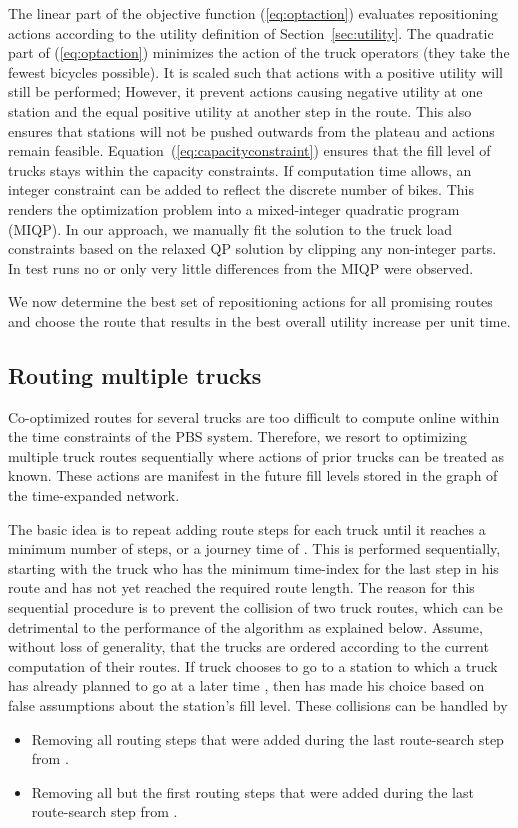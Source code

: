 \documentclass{article}
\begin{document}
The linear part of the objective function (\ref{eq:optaction}) evaluates
repositioning actions according to the utility definition of
Section~\ref{sec:utility}. The quadratic part of (\ref{eq:optaction}) minimizes
the action of the truck operators (they take the fewest bicycles possible). It
is scaled such that actions with a positive utility will still be performed;
However, it prevent actions causing negative utility at one station and the
equal positive utility at another step in the route. This also ensures that
stations will not be pushed outwards from the plateau and actions remain
feasible. Equation~(\ref{eq:capacityconstraint}) ensures that the fill level of
trucks stays within the capacity constraints. If computation time allows, an
integer constraint  can be added to
reflect the discrete number of bikes. This renders the optimization problem into
a mixed-integer quadratic program (MIQP). In our approach, we manually fit the
solution to the truck load constraints based on the relaxed QP solution by
clipping any non-integer parts. In test runs no or only very little differences
from the MIQP were observed.


We now determine the best set of repositioning actions for all promising routes
and choose the route that results in the best overall utility increase per unit
time.

\subsection{Routing multiple trucks}\label{sec:multiple}
Co-optimized routes for several trucks are too difficult to compute online
within the time constraints of the PBS system. Therefore, we resort to
optimizing multiple truck routes sequentially where actions of prior trucks can
be treated as known. These actions are manifest in the future fill levels stored
in the graph of the time-expanded network.

The basic idea is to repeat adding route steps for each truck until it reaches a
minimum number of  steps, or a journey time of . This is
performed sequentially, starting with the truck who has the minimum time-index
for the last step in his route and has not yet reached the required route
length. The reason for this sequential procedure is to prevent the collision of
two truck routes, which can be detrimental to the performance of the algorithm
as explained below. Assume, without loss of generality, that the trucks 
are ordered according to the current computation of their routes. If truck 
chooses to go to a station  to which a truck  has already planned to
go at a later time , then  has made his choice
based on false assumptions about the station's fill level. These collisions can
be handled by
\begin{itemize}
\item Removing all routing steps that were added during the last route-search
  step from .
\item Removing all but the first routing steps that were added during the last
  route-search step from .
\end{itemize}
\end{document}
